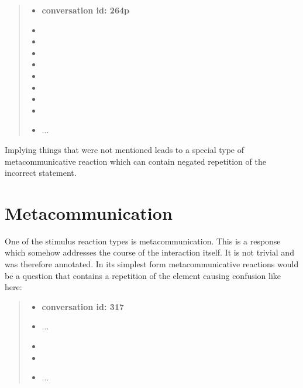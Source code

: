     \begin{quote}
    \begin{itemize}[label={}, leftmargin=0pt, itemsep=0.5em]
    \item \textbf{conversation id: 264p}
    \item {}
    \item {}
    \item {}
    \item {}
    \item {}
    \item {}
    \item {}
    \item {}
    \item ...
    \end{itemize}
    \end{quote}

    Implying things that were not mentioned leads to a special type of metacommunicative reaction
    which can contain negated repetition of the incorrect statement.

\section{Metacommunication}

One of the stimulus reaction types is metacommunication.
This is a response which somehow addresses the course of the interaction itself.
It is not trivial and was therefore annotated.
In its simplest form metacommunicative reactions would be
a question that contains a repetition of the element causing confusion like here:

    \begin{quote}
    \begin{itemize}[label={}, leftmargin=0pt, itemsep=0.5em]
    \item \textbf{conversation id: 317}
    \item ...
    \item {}
    \item {}
    \item ...
    \end{itemize}
    \end{quote}

